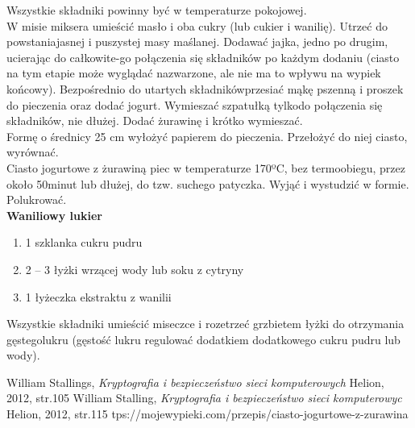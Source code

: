 \documentclass[12pt, a4paper, titlepage]{article}
\begin{document}
\noindent Wszystkie składniki powinny być w temperaturze pokojowej.
\\

\noindent W misie miksera umieścić masło i oba cukry (lub cukier i wanilię). Utrzeć do powstaniajasnej i puszystej masy maślanej. Dodawać jajka, jedno po drugim, ucierając do całkowite-go połączenia się składników po każdym dodaniu (ciasto na tym etapie może wyglądać nazwarzone, ale nie ma to wpływu na wypiek końcowy). Bezpośrednio do utartych składnikówprzesiać mąkę pszenną i proszek do pieczenia oraz dodać jogurt. Wymieszać szpatułką tylkodo połączenia się składników, nie dłużej. Dodać żurawinę i krótko wymieszać.
\\

\noindent Formę o średnicy 25 cm wyłożyć papierem do pieczenia. Przełożyć do niej ciasto, wyrównać.
\\

\noindent Ciasto jogurtowe z żurawiną piec w temperaturze 170ºC, bez termoobiegu, przez około 50minut lub dłużej, do tzw. suchego patyczka. Wyjąć i wystudzić w formie. Polukrować.
\\

\noindent \textbf{Waniliowy lukier}
\begin{enumerate}[•]
\item 1 szklanka cukru pudru
\item 2 – 3 łyżki wrzącej wody lub soku z cytryny
\item 1 łyżeczka ekstraktu z wanilii
\end{enumerate}

\noindent Wszystkie składniki umieścić miseczce i rozetrzeć grzbietem łyżki do otrzymania gęstegolukru (gęstość lukru regulować dodatkiem dodatkowego cukru pudru lub wody).


\begin{thebibliography}{9}
William Stallings,
\textit{Kryptografia  i  bezpieczeństwo  sieci  komputerowych}
Helion,
2012, str.105
William Stalling,
\textit{Kryptografia  i  bezpieczeństwo  sieci  komputerowyc}
Helion,
2012, str.115
tps://mojewypieki.com/przepis/ciasto-jogurtowe-z-zurawina
\end{thebibliography}
\end{document}
